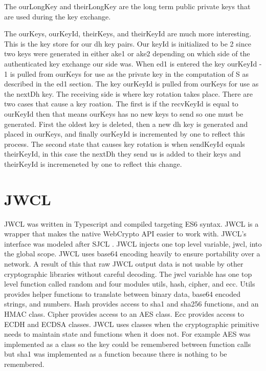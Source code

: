 The ourLongKey and theirLongKey are the long term public private keys that are used during the key exchange. 


The ourKeys, ourKeyId, theirKeys, and theirKeyId are much more interesting. This is the key store for our dh key pairs. Our keyId is initialized to be 2 since two keys were generated in either ake1 or ake2 depending on which side of the authenticated key exchange our side was. When ed1 is entered the key ourKeyId - 1 is pulled from ourKeys for use as the private key in the computation of S as described in the ed1 section. The key ourKeyId is pulled from ourKeys for use as the nextDh key. The receiving side is where key rotation takes place. There are two cases that cause a key roation. The first is if the recvKeyId is equal to ourKeyId then that means ourKeys has no new keys to send so one must be generated. First the oldest key is deleted, then a new dh key is generated and placed in ourKeys, and finally ourKeyId is incremented by one to reflect this process. The second state that causes key rotation is when sendKeyId equals theirKeyId, in this case the nextDh they send us is added to their keys and theirKeyId is incremeneted by one to reflect this change.


\section{JWCL}


JWCL was written in Typescript and compiled targeting ES6 syntax. JWCL is a wrapper that makes the native WebCrypto API easier to work with. JWCL’s interface was modeled after SJCL \cite{sjcl-library}. JWCL injects one top level variable, jwcl, into the global scope. JWCL uses base64 encoding heavily to ensure portability over a network. A result of this that raw JWCL output data is not usable by other cryptographic libraries without careful decoding. The jwcl variable has one top level function called random and four modules utils, hash, cipher, and ecc. Utils provides helper functions to translate between binary data, base64 encoded strings, and numbers. Hash provides access to sha1 and sha256 functions, and an HMAC class. Cipher provides access to an AES class. Ecc provides access to ECDH and ECDSA classes. JWCL uses classes when the cryptographic primitive needs to maintain state and functions when it does not. For example AES was implemented as a class so the key could be remembered between function calls but sha1 was implemented as a function because there is nothing to be remembered. 


